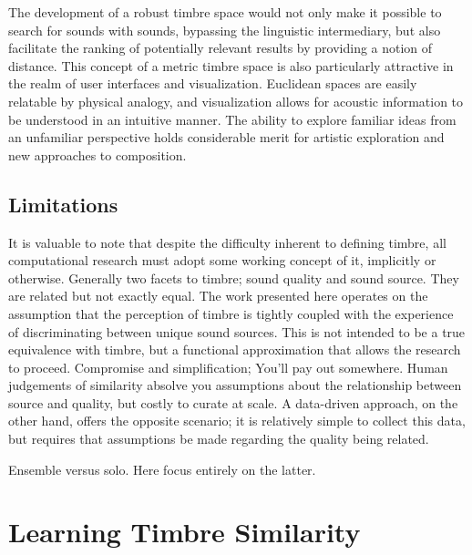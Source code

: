 The development of a robust timbre space would not only make it possible to search for sounds with sounds, bypassing the linguistic intermediary, but also facilitate the ranking of potentially relevant results by providing a notion of distance.
This concept of a metric timbre space is also particularly attractive in the realm of user interfaces and visualization.
Euclidean spaces are easily relatable by physical analogy, and visualization allows for acoustic information to be understood in an intuitive manner.
The ability to explore familiar ideas from an unfamiliar perspective holds considerable merit for artistic exploration and new approaches to composition.


\subsection{Limitations}

It is valuable to note that despite the difficulty inherent to defining timbre, all computational research must adopt some working concept of it, implicitly or otherwise.
Generally two facets to timbre; sound quality and sound source.
They are related but not exactly equal.
The work presented here operates on the assumption that the perception of timbre is tightly coupled with the experience of discriminating between unique sound sources.
This is not intended to be a true equivalence with timbre, but a functional approximation that allows the research to proceed.
Compromise and simplification; You'll pay out somewhere.
Human judgements of similarity absolve you assumptions about the relationship between source and quality, but costly to curate at scale.
A data-driven approach, on the other hand, offers the opposite scenario; it is relatively simple to collect this data, but requires that assumptions be made regarding the quality being related.

Ensemble versus solo.
Here focus entirely on the latter.




\section{Learning Timbre Similarity}
\label{sec:timbre_similarity}

